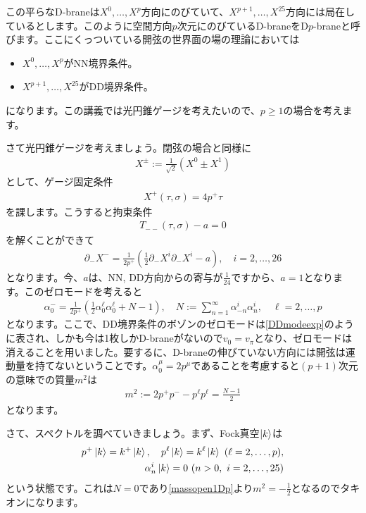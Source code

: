 \documentclass[report,paper=a4, fontsize=12pt, line_length=16cm, number_of_lines=34,dvipdfmx]{jlreq}
\numberwithin{equation}{chapter}
\numberwithin{equation}{section}
\newcommand{\del}{\partial}
\begin{document}
この平らなD-braneは$X^0,\dots,X^{p}$方向にのびていて、$X^{p+1},\dots,X^{25}$方向には局在しているとします。このように空間方向$p$次元にのびているD-braneをD$p$-braneと呼びます。ここにくっついている開弦の世界面の場の理論においては
\begin{itemize}
  \item $X^0,\dots,X^{p}$がNN境界条件。
  \item $X^{p+1},\dots,X^{25}$がDD境界条件。
\end{itemize}
になります。この講義では光円錐ゲージを考えたいので、$p\ge 1$の場合を考えます。

さて光円錐ゲージを考えましょう。閉弦の場合と同様に
\begin{align}
  X^{\pm}:=\frac{1}{\sqrt{2}}(X^{0}\pm X^{1})
\end{align}
として、ゲージ固定条件
\begin{align}
  X^{+}(\tau,\sigma)=4p^{+}\tau
\end{align}
を課します。こうすると拘束条件
\begin{align}
  T_{--}(\tau,\sigma)-a=0
\end{align}
を解くことができて
\begin{align}
  \del_{-}X^{-}=\frac{1}{2p^{+}}\left( \frac12 \del_{-}X^{i}\del_{-}X^{i}-a \right),\quad i=2,\dots,26
\end{align}
となります。今、$a$は、NN, DD方向からの寄与が$\frac{1}{24}$ですから、$a=1$となります。このゼロモードを考えると
\begin{align}
  \alpha^{-}_{0}=\frac{1}{2p^{+}}\left( \frac12 \alpha_{0}^{\ell}\alpha_{0}^{\ell}+N-1 \right),\quad N:=\sum_{n=1}^{\infty} \alpha_{-n}^{i}\alpha_{n}^{i},\quad \ell=2,\dots,p\label{singlebranezeromode}
\end{align}
となります。ここで、DD境界条件のボゾンのゼロモードは\eqref{DDmodeexp}のように表され、しかも今は1枚しかD-braneがないので$v_0=v_{\pi}$となり、ゼロモードは消えることを用いました。要するに、D-braneの伸びていない方向には開弦は運動量を持てないということです。$\alpha^{\mu}_{0}=2p^{\mu}$であることを考慮すると$(p+1)$次元の意味での質量$m^2$は
\begin{align}
  m^2:=2p^{+}p^{-}-p^{\ell}p^{\ell}=\frac{N-1}{2}\label{massopen1Dp}
\end{align}
となります。

さて、スペクトルを調べていきましょう。まず、Fock真空$\ket{k}$は
\begin{align}
  p^{+}\ket{k}=k^{+}\ket{k},\quad
  p^{\ell}\ket{k}=k^{\ell}\ket{k}\ (\ell=2,\dots,p),\nonumber\\
 \alpha_{n}^{i}\ket{k}=0\ (n>0,\ i=2,\dots,25)
\end{align}
という状態です。これは$N=0$であり\eqref{massopen1Dp}より$m^2=-\frac12$となるのでタキオンになります。
\end{document}
